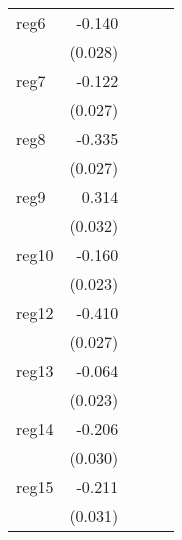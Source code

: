{\begin{longtable}{l*{4}{D{.}{.}{-1}}}
\addlinespace
reg6        &      -0.140\sym{***}&                     &                     &                     \\
            &     (0.028)         &                     &                     &                     \\
\addlinespace
reg7        &      -0.122\sym{***}&                     &                     &                     \\
            &     (0.027)         &                     &                     &                     \\
\addlinespace
reg8        &      -0.335\sym{***}&                     &                     &                     \\
            &     (0.027)         &                     &                     &                     \\
\addlinespace
reg9        &       0.314\sym{***}&                     &                     &                     \\
            &     (0.032)         &                     &                     &                     \\
\addlinespace
reg10       &      -0.160\sym{***}&                     &                     &                     \\
            &     (0.023)         &                     &                     &                     \\
\addlinespace
reg12       &      -0.410\sym{***}&                     &                     &                     \\
            &     (0.027)         &                     &                     &                     \\
\addlinespace
reg13       &      -0.064\sym{**} &                     &                     &                     \\
            &     (0.023)         &                     &                     &                     \\
\addlinespace
reg14       &      -0.206\sym{***}&                     &                     &                     \\
            &     (0.030)         &                     &                     &                     \\
\addlinespace
reg15       &      -0.211\sym{***}&                     &                     &                     \\
            &     (0.031)         &                     &                     &                     \\

\end{longtable}}
